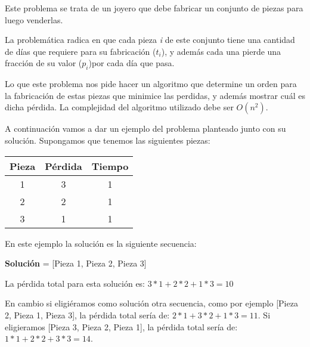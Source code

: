 Este problema se trata de un joyero que debe fabricar un conjunto de piezas para luego venderlas. 

La problemática radica en que cada pieza \emph{i} de este conjunto tiene una cantidad de días que requiere para su fabricación  (\emph{$t_i$}), y además cada una pierde una fracción de su valor (\emph{$p_i$})por cada día que pasa.

Lo que este problema nos pide hacer un algoritmo que determine un orden para la fabricación de estas piezas que minimice las perdidas, y además mostrar cuál es dicha pérdida. La complejidad del algoritmo utilizado debe ser $O(n^2)$.

A continuación vamos a dar un ejemplo del problema planteado junto con su solución. Supongamos que tenemos las siguientes piezas:

\begin{tabular}{|c|c|c|}
 \hline
 \textbf{Pieza} & \textbf{Pérdida} & \textbf{Tiempo} \\
 \hline
 1 & 3 & 1 \\
 
 2 & 2 & 1 \\
 
 3 & 1 & 1 \\
 \hline
\end{tabular}

En este ejemplo la solución es la siguiente secuencia:

\textbf{Solución} = [Pieza 1, Pieza 2, Pieza 3]

La pérdida total para esta solución es: $3*1 + 2*2 + 1*3 = 10$

En cambio si eligiéramos como solución otra secuencia, como por ejemplo [Pieza 2, Pieza 1, Pieza 3], la pérdida total sería de: $2*1 + 3*2 + 1*3 = 11$. Si eligieramos [Pieza 3, Pieza 2, Pieza 1], la pérdida total sería de: $1*1 + 2*2 + 3*3 = 14$.